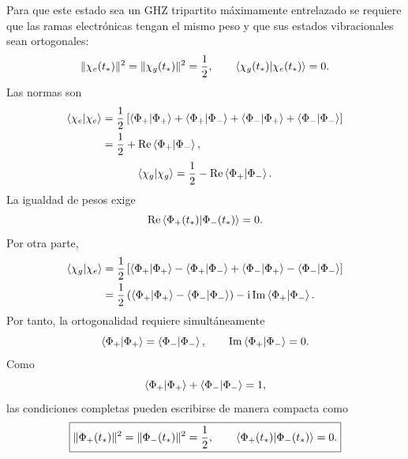 Para que este estado sea un GHZ tripartito m\'aximamente entrelazado se
requiere que las ramas electr\'onicas tengan el mismo peso y que sus estados
vibracionales sean ortogonales:
\begin{equation}
  \|\chi_e(t_*)\|^2
  =
  \|\chi_g(t_*)\|^2
  =
  \frac12,
  \qquad
  \braket{\chi_g(t_*)|\chi_e(t_*)}=0.
\end{equation}
Las normas son
\begin{equation}
\begin{aligned}
  \braket{\chi_e|\chi_e}
  &={}
  \frac12
  \left[
  \braket{\Phi_+|\Phi_+}
  +\braket{\Phi_+|\Phi_-}
  +\braket{\Phi_-|\Phi_+}
  +\braket{\Phi_-|\Phi_-}
  \right]
  \\
  &=
  \frac12+\operatorname{Re}\braket{\Phi_+|\Phi_-},
\end{aligned}
\end{equation}
\begin{equation}
  \braket{\chi_g|\chi_g}
  =
  \frac12-\operatorname{Re}\braket{\Phi_+|\Phi_-}.
\end{equation}
La igualdad de pesos exige
\begin{equation}
  \operatorname{Re}\braket{\Phi_+(t_*)|\Phi_-(t_*)}=0.
\end{equation}
Por otra parte,
\begin{equation}
\begin{aligned}
  \braket{\chi_g|\chi_e}
  ={}&
  \frac12
  \left[
  \braket{\Phi_+|\Phi_+}
  -\braket{\Phi_+|\Phi_-}
  +\braket{\Phi_-|\Phi_+}
  -\braket{\Phi_-|\Phi_-}
  \right]
  \\
  ={}&
  \frac12
  \left(
  \braket{\Phi_+|\Phi_+}
  -\braket{\Phi_-|\Phi_-}
  \right)
  -\mathrm{i}\operatorname{Im}\braket{\Phi_+|\Phi_-}.
\end{aligned}
\end{equation}
Por tanto, la ortogonalidad requiere simult\'aneamente
\begin{equation}
  \braket{\Phi_+|\Phi_+}
  =
  \braket{\Phi_-|\Phi_-},
  \qquad
  \operatorname{Im}\braket{\Phi_+|\Phi_-}=0.
\end{equation}
Como
\begin{equation}
  \braket{\Phi_+|\Phi_+}
  +
  \braket{\Phi_-|\Phi_-}=1,
\end{equation}
las condiciones completas pueden escribirse de manera compacta como
\begin{equation}
  \boxed{
  \|\Phi_+(t_*)\|^2
  =
  \|\Phi_-(t_*)\|^2
  =
  \frac12,
  \qquad
  \braket{\Phi_+(t_*)|\Phi_-(t_*)}=0.
  }
\end{equation}

